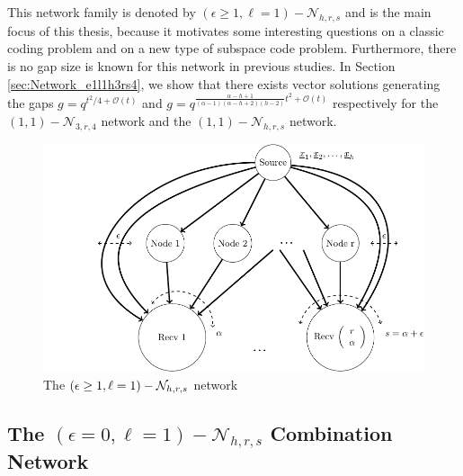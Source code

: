 This network family is denoted by $\left(\epsilon\geq1,\ell=1\right)-\mathcal{N}_{h,r,s}$
and is the main focus of this thesis, because it motivates some interesting
questions on a classic coding problem and on a new type of subspace
code problem. Furthermore, there is no gap size is known for this
network in previous studies. In Section \ref{sec:Network_e1l1h3rs4},
we show that there exists vector solutions generating the gaps $g=q^{t^{2}/4+\mathcal{O}(t)}$
and $g=q^{\frac{\alpha-h+1}{\left(\alpha-1\right)\left(\alpha-h+2\right)\left(h-2\right)}t^{2}+\mathcal{O}(t)}$
respectively for the $\left(1,1\right)-\mathcal{N}_{3,r,4}$ network
and the $\left(1,1\right)-\mathcal{N}_{h,r,s}$ network. 
\begin{figure}[H]
\caption{The $\left(\epsilon\protect\geq1,\ell=1\right)-\mathcal{N}_{h,r,s}$
network \label{fig:network_special3}}

\centering{}\includegraphics[width=0.45\paperwidth]{./figures/nw_special3}
\end{figure}


\subsection{The $\left(\epsilon=0,\ell=1\right)-\mathcal{N}_{h,r,s}$ Combination
Network}


